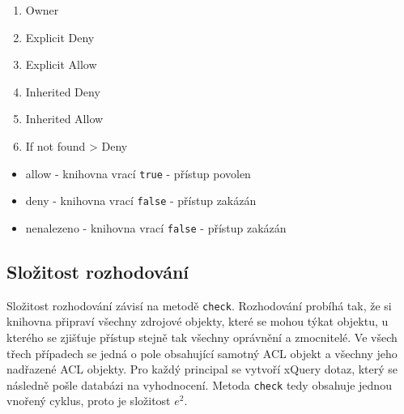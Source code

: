\begin{enumerate}
\item Owner
\item Explicit Deny
\item Explicit Allow
\item Inherited Deny
\item Inherited Allow
\item If not found > Deny
\end{enumerate}

\begin{itemize}
\item allow - knihovna vrací \verb|true| - přístup povolen
\item deny - knihovna vrací \verb|false| - přístup zakázán
\item nenalezeno - knihovna vrací \verb|false| - přístup zakázán
\end{itemize}

\subsection{Složitost rozhodování}
Složitost rozhodování závisí na metodě \verb|check|. 
Rozhodování probíhá tak, že si knihovna připraví všechny zdrojové objekty, které se mohou týkat objektu, u kterého se zjišťuje přístup stejně tak všechny oprávnění a zmocnitelé. Ve všech třech případech se jedná o pole obsahující samotný ACL objekt a všechny jeho nadřazené ACL objekty. Pro každý principal se vytvoří xQuery dotaz, který se následně pošle databázi na vyhodnocení. Metoda \verb|check| tedy obsahuje jednou vnořený cyklus, proto je složitost $e^2$.
